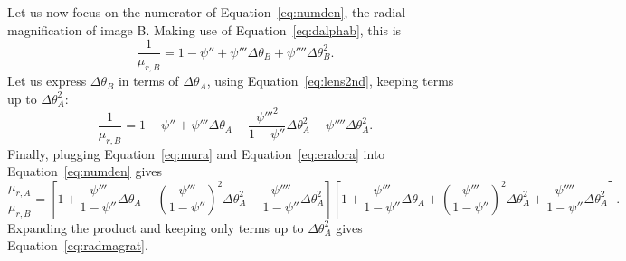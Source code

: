 \documentclass[usenatbib]{mnras}
\def\psiii{\psi''}
\def\psiiii{\psi'''}
\def\psiiv{\psi''''}
\def\Eref#1{Equation~\ref{#1}\xspace}
\begin{document}
Let us now focus on the numerator of \Eref{eq:numden}, the radial magnification of image B.
Making use of \Eref{eq:dalphab}, this is
\begin{equation}
\frac{1}{\mu_{r,B}} = 1 - \psiii + \psiiii\Delta\theta_B + \psiiv\Delta\theta_B^2.
\end{equation}
Let us express $\Delta\theta_B$ in terms of $\Delta\theta_A$, using \Eref{eq:lens2nd}, keeping terms up to $\Delta\theta_A^2$:
\begin{equation}\label{eq:eralora}
\frac{1}{\mu_{r,B}} = 1 - \psiii + \psiiii\Delta\theta_A - \frac{\psi'''^2}{1-\psiii}\Delta\theta_A^2 - \psiiv\Delta\theta_A^2.
\end{equation}
Finally, plugging \Eref{eq:mura} and \Eref{eq:eralora} into \Eref{eq:numden} gives
\begin{equation}
\frac{\mu_{r,A}}{\mu_{r,B}} = \left[1 + \frac{\psiiii}{1-\psiii}\Delta\theta_A - \left(\frac{\psiiii}{1-\psiii}\right)^2\Delta\theta_A^2 - \frac{\psiiv}{1-\psiii}\Delta\theta_A^2\right]\left[1 + \frac{\psiiii}{1-\psiii}\Delta\theta_A + \left(\frac{\psiiii}{1-\psiii}\right)^2\Delta\theta_A^2 + \frac{\psiiv}{1-\psiii}\Delta\theta_A^2\right].
\end{equation}
Expanding the product and keeping only terms up to $\Delta\theta_A^2$ gives \Eref{eq:radmagrat}.
\end{document}
